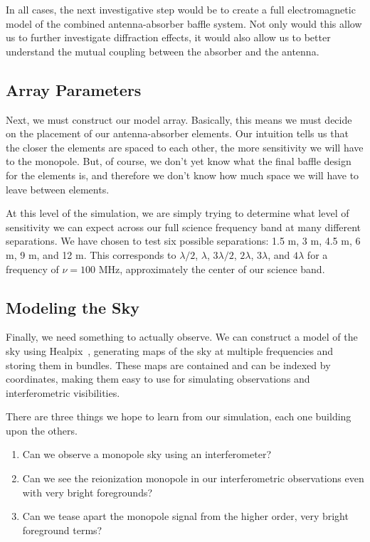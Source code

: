 In all cases, the next investigative step would be to create a full 
electromagnetic model of the combined antenna-absorber baffle system. Not only 
would this allow us to further investigate diffraction effects, it would also 
allow us to better understand the mutual coupling between the absorber and the 
antenna.

\subsection{Array Parameters}

Next, we must construct our model array. Basically, this means we must decide 
on the placement of our antenna-absorber elements. Our intuition tells us that 
the closer the elements are spaced to each other, the more sensitivity we will 
have to the monopole. But, of course, we don't yet know what the final baffle 
design for the elements is, and therefore we don't know how much space we will 
have to leave between elements.

At this level of the simulation, we are simply trying to determine what level 
of sensitivity we can expect across our full science frequency band at many 
different separations. We have chosen to test six possible separations: 1.5 m, 
3 m, 4.5 m, 6 m, 9 m, and 12 m. This corresponds to $\lambda/2$, $\lambda$, 
  $3\lambda/2$, $2\lambda$, $3\lambda$, and $4\lambda$ for a frequency of $\nu 
  = 100$ MHz, approximately the center of our science band.

\subsection{Modeling the Sky}

Finally, we need something to actually observe. We can construct a model of the 
sky using Healpix~\citep{gorski2005}, generating maps of the sky at multiple 
frequencies and storing them in bundles. These maps are contained and can be 
indexed by coordinates, making them easy to use for simulating observations and 
interferometric visibilities.

There are three things we hope to learn from our simulation, each one building 
upon the others.
\begin{enumerate}
 \item Can we observe a monopole sky using an interferometer?
 \item Can we see the reionization monopole in our interferometric observations 
  even with very bright foregrounds?
 \item Can we tease apart the monopole signal from the higher order, very 
  bright foreground terms?
\end{enumerate}

